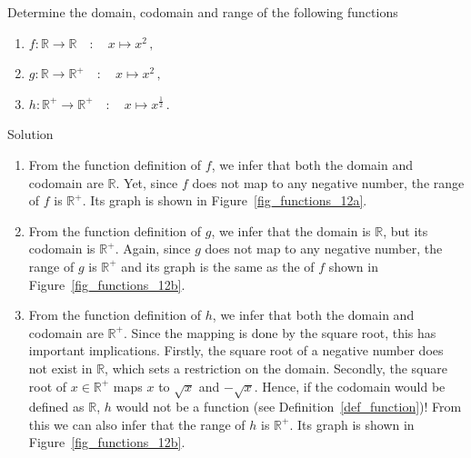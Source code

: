 \begin{example}
\label{example_domain_codomain_range}
Determine the domain, codomain and range of the following functions
\begin{enumerate}
\item  $f:\mathbb{R}\to \mathbb{R}\quad:\quad x\mapsto x^2\,,$
\item  $g:\mathbb{R}\to \mathbb{R}^+\quad:\quad x\mapsto x^2\,,$
\item $h:\mathbb{R}^+\to \mathbb{R}^+\quad:\quad x \mapsto x^{\frac{1}{2}}\,.$
\end{enumerate}

Solution 

\begin{enumerate}
\item  From the function definition of $f$, we infer that both the domain and codomain are $\mathbb{R}$. Yet, since $f$ does not map to any negative number, the range of $f$ is $\mathbb{R}^+$. Its graph is shown in Figure~\ref{fig_functions_12a}.
\item  From the function definition of $g$, we infer that the domain is $\mathbb{R}$, but its codomain is $\mathbb{R}^+$. Again, since $g$  does not map to any negative number, the range of $g$ is $\mathbb{R}^+$ and its graph is the same as the of $f$ shown in Figure~\ref{fig_functions_12b}.
\item  From the function definition of $h$, we infer that both the domain and codomain are $\mathbb{R}^+$. Since the mapping is done by the square root, this has important implications. Firstly, the square root of a negative number does not exist in $\mathbb{R}$, which sets a restriction on the domain. Secondly, the square root of $x \in \mathbb{R}^+$ maps $x$ to $\sqrt{x}$ and $-\sqrt{x}$. Hence, if the codomain would be defined as $\mathbb{R}$, $h$ would not be a function (see Definition~\ref{def_function})! From this we can also infer that the range of $h$ is $\mathbb{R}^+$. Its graph is shown in Figure~\ref{fig_functions_12b}.
\end{enumerate}



\end{example}
